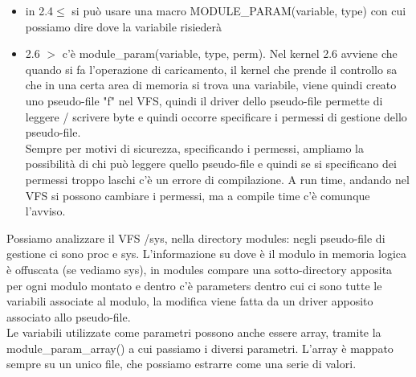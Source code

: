 \documentclass[12pt, oneside]{extbook}
\begin{document}
\begin{itemize}
\item in 2.4$\leq$ si può usare una macro \textsf{MODULE\_PARAM(variable, type)} con cui possiamo dire dove la variabile risiederà
\item 2.6 $>$ c'è \textsf{module\_param(variable, type, perm)}. Nel kernel 2.6 avviene che quando si fa l'operazione di caricamento, il kernel che prende il controllo sa che in una certa area di memoria si trova una variabile, viene quindi creato uno pseudo-file "f" nel VFS, quindi il driver dello pseudo-file permette di leggere / scrivere byte e quindi occorre specificare i permessi di gestione dello pseudo-file.\\Sempre per motivi di sicurezza, specificando i permessi, ampliamo la possibilità di chi può leggere quello pseudo-file e quindi se si specificano dei permessi troppo laschi c'è un errore di compilazione. A run time, andando nel VFS si possono cambiare i permessi, ma a compile time c'è comunque l'avviso.
\end{itemize}
Possiamo analizzare il VFS /sys, nella directory modules: negli pseudo-file di gestione ci sono proc e sys. L'informazione su dove è il modulo in memoria logica è offuscata (se vediamo sys), in modules compare una sotto-directory apposita per ogni modulo montato e dentro c'è parameters dentro cui ci sono tutte le variabili associate al modulo, la modifica viene fatta da un driver apposito associato allo pseudo-file.\\Le variabili utilizzate come parametri possono anche essere array, tramite la \textsf{module\_param\_array()} a cui passiamo i diversi parametri. L'array è mappato sempre su un unico file, che possiamo estrarre come una serie di valori.
\end{document}
